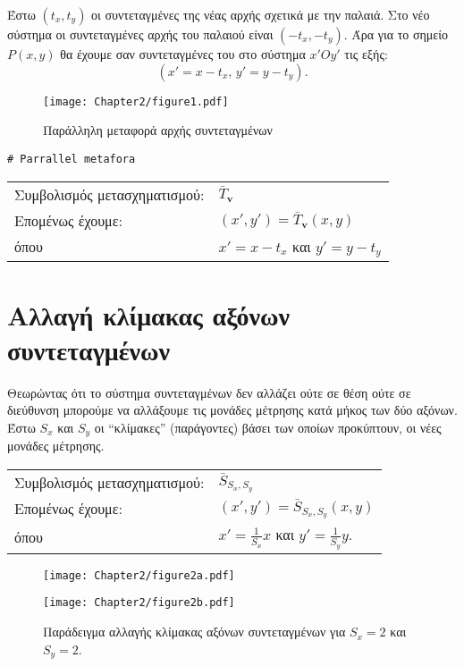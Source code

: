 Έστω \((t_x, t_y)\) οι συντεταγμένες της νέας αρχής σχετικά με την παλαιά. Στο νέο σύστημα οι συντεταγμένες αρχής του παλαιού είναι \((-t_x, -t_y)\). Άρα για το σημείο \(P(x, y)\) θα έχουμε σαν συντεταγμένες του στο σύστημα \(x'Oy'\) τις εξής:
%
\[
(x' = x - t_x, \, y' = y - t_y).
\]

\begin{figure}[hbt]
  \begin{center}
	\texttt{[image: Chapter2/figure1.pdf]}
  \end{center}
  \caption{Παράλληλη μεταφορά αρχής συντεταγμένων}
\end{figure}




\begin{lstlisting}
# Parrallel metafora	
\end{lstlisting}





\begin{tabular}{m{}m{}}
	Συμβολισμός μετασχηματισμού: & $ \bar{T}_\mathbf{v} $\\
	Επομένως έχουμε: & $(x', y') = \bar{T}_\mathbf{v}(x, y)$\\
	όπου & $x' = x - t_x$ και $y' = y - t_y$
\end{tabular}


\section{Αλλαγή κλίμακας αξόνων συντεταγμένων}

Θεωρώντας ότι το σύστημα συντεταγμένων δεν αλλάζει ούτε σε θέση ούτε σε διεύθυνση μπορούμε να αλλάξουμε τις μονάδες μέτρησης κατά μήκος των δύο αξόνων. Έστω $S_x$ και $S_y$ οι ``κλίμακες'' (παράγοντες) βάσει των οποίων προκύπτουν, οι νέες μονάδες μέτρησης.
 
 
\begin{tabular}{m{}m{}}
	Συμβολισμός μετασχηματισμού: & $ \bar{S}_{S_x, S_y}$\\
	Επομένως έχουμε: & $(x', y') = \bar{S}_{S_x, S_y}(x, y)$\\
	όπου & $x' = \frac{1}{S_x} x$ και $y' = \frac{1}{S_y} y$.
\end{tabular}


\begin{figure}[h!]
\begin{center}
	\begin{minipage}[b]{0.48\textwidth} %
	    \texttt{[image: Chapter2/figure2a.pdf]}
	\end{minipage}%
	\hfill
	\begin{minipage}[b]{0.48\textwidth} %
	    \texttt{[image: Chapter2/figure2b.pdf]}
	\end{minipage}
\end{center}
  \caption{Παράδειγμα αλλαγής κλίμακας αξόνων συντεταγμένων για $S_x = 2$ και $S_y = 2$.}
\end{figure}


